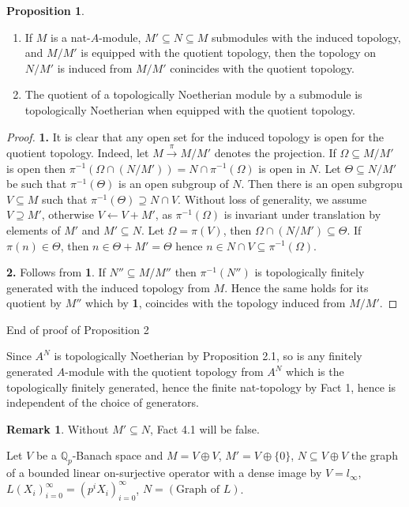 \documentclass[10pt]{article}
\numberwithin{equation}{section}
\theoremstyle{definition}
\newtheorem{proposition}{Proposition}[subsection]
\newtheorem{remark}{Remark}[subsection]
\newcommand{\Q}[0]{\mathbb{Q}}
\begin{document}
\begin{proposition}$\:$
    \label{fact_29_4}
    \begin{enumerate}[1.]
        \item If $M$ is a nat-$A$-module, $M'\subseteq N\subseteq M$ submodules with the induced topology, and $M/M'$ is equipped with the quotient topology, then the topology on $N/M'$ is induced from $M/M'$ conincides with the quotient topology.
        \item The quotient of a topologically Noetherian module by a submodule is topologically Noetherian when equipped with the quotient topology.
    \end{enumerate}
\end{proposition}
\begin{proof}\textbf{1.} 
    It is clear that any open set for the induced topology is open for the quotient topology. Indeed, let $M\stackrel{\pi}{\to}M/M'$ denotes the projection. If $\Omega\subseteq M/M'$ is open then $\pi^{-1}(\Omega\cap(N/M'))=N\cap \pi^{-1}(\Omega)$ is open in $N$. Let $\Theta\subseteq N/M'$ be such that $\pi^{-1}(\Theta)$ is an open subgroup of $N$. 
    Then there is an open subgropu $V\subseteq M$ such that $\pi^{-1}(\Theta)\supseteq N\cap V$. Without loss of generality, we assume $V\supseteq M'$, otherwise $V\leftarrow V+M'$, as $\pi^{-1}(\Omega)$ is invariant
    under translation by elements of $M'$ and $M'\subseteq N$. Let $\Omega = \pi(V)$, then $\Omega\cap(N/M')\subseteq \Theta$. If $\pi(n)\in\Theta$, then $n\in\Theta+M'=\Theta$ hence $n\in N\cap V\subseteq\pi^{-1}(\Omega)$.
    \par\textbf{2.} Follows from \textbf{1}. If $N''\subseteq M/M''$ then $\pi^{-1}(N'')$ is topologically finitely generated with the induced topology from $M$. Hence the same holds for its 
    quotient by $M''$ which by \textbf{1}, coincides with the topology induced from $M/M'$. 
\end{proof}

End of proof of Proposition 2

Since $A^N$ is topologically Noetherian by Proposition 2.1, so is any finitely generated $A$-module with the quotient topology from $A^N$ which is the topologically finitely generated, hence the finite nat-topology by Fact 1, hence is independent of the choice of generators.


\begin{remark}
    Without $M'\subseteq N$, Fact 4.1 will be false.
    \par Let $V$ be a $\Q_p$-Banach space and $M=V\oplus V$, $M'=V\oplus\{0\}$, $N\subseteq V\oplus V$ the graph of a bounded linear on-surjective operator with a dense image by $V=l_\infty$, $L(X_i)_{i=0}^\infty =(p^iX_i)^\infty_{i=0}$, $N=(\text{Graph of }L)$.
\end{remark}
\end{document}
